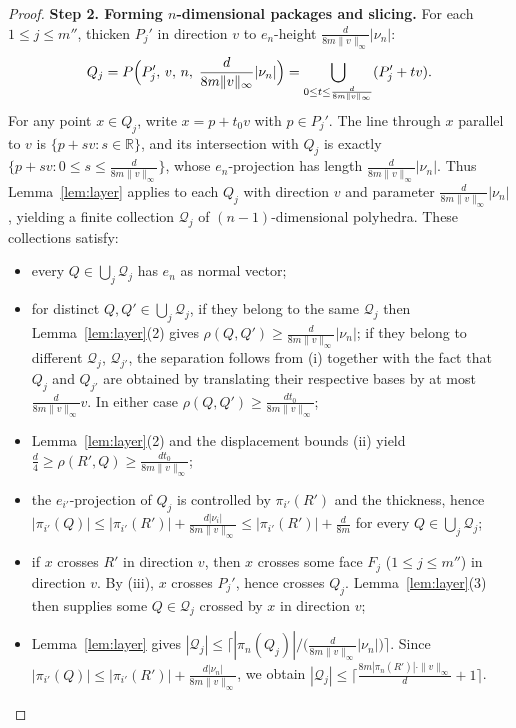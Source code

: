 \documentclass[10pt,a4paper]{amsart}
\begin{document}
\begin{proof}
\medskip\noindent
\textbf{Step 2.  Forming $n$-dimensional packages and slicing.}
For each $1\leq j\leq m''$, thicken $P_j'$ in direction $v$ to
$e_n$-height $\frac{d}{8m\|v\|_\infty}|\nu_n|$:
\[
Q_j=P\Bigl(P_j',\, v,\, n,\; \frac{d}{8m\|v\|_\infty}|\nu_n|\Bigr)
=\bigcup_{0\leq t\leq \frac{d}{8m\|v\|_\infty}}(P_j'+t v).
\]
For any point $x\in Q_j$, write $x=p+t_0 v$ with $p\in P_j'$.  The line
through $x$ parallel to $v$ is $\{p+sv\colon s\in\mathbb{R}\}$, and its
intersection with $Q_j$ is exactly $\{p+sv\colon
0\leq s\leq\frac{d}{8m\|v\|_\infty}\}$, whose $e_n$-projection has length
$\frac{d}{8m\|v\|_\infty}|\nu_n|$.  Thus Lemma~\ref{lem:layer} applies to
each $Q_j$ with direction $v$ and parameter $\frac{d}{8m\|v\|_\infty}|\nu_n|$,
yielding a finite collection $\mathcal{Q}_j$ of $(n-1)$-dimensional polyhedra.
These collections satisfy:
\begin{itemize}
\item[(iv)] every $Q\in\bigcup_j\mathcal{Q}_j$ has $e_n$ as normal vector;
\item[(v)] for distinct $Q,Q'\in\bigcup_j\mathcal{Q}_j$, if they belong to
the same $\mathcal{Q}_j$ then Lemma~\ref{lem:layer}(2) gives
$\rho(Q,Q')\geq\frac{d}{8m\|v\|_\infty}|\nu_n|$; if they belong to different
$\mathcal{Q}_j$, $\mathcal{Q}_{j'}$, the separation follows from (i) together
with the fact that $Q_j$ and $Q_{j'}$ are obtained by translating their
respective bases by at most $\frac{d}{8m\|v\|_\infty}v$.  In either case
$\rho(Q,Q')\geq\frac{d t_0}{8m\|v\|_\infty}$;
\item[(vi)] Lemma~\ref{lem:layer}(2) and the displacement bounds (ii) yield
$\frac{d}{4}\geq\rho(R',Q)\geq\frac{d t_0}{8m\|v\|_\infty}$;
\item[(vii)] the $e_{i'}$-projection of $Q_j$
is controlled by $\pi_{i'}(R')$ and the thickness,
hence $|\pi_{i'}(Q)|\leq |\pi_{i'}(R')|+\frac{d|\nu_i|}{8m\|v\|_{\infty}}\leq |\pi_{i'}(R')|+\frac{d}{8m}$ for every
$Q\in\bigcup_j\mathcal{Q}_j$;
\item[(viii)] if $x$ crosses $R'$ in direction $v$, then $x$ crosses some
face $F_j$ ($1\leq j\leq m''$) in direction $v$.  By (iii), $x$ crosses
$P_j'$, hence crosses $Q_j$.
Lemma~\ref{lem:layer}(3) then supplies some $Q\in\mathcal{Q}_j$ crossed by
$x$ in direction $v$;
\item[(ix)] Lemma~\ref{lem:layer} gives
$|\mathcal{Q}_j|\leq\bigl\lceil |\pi_n(Q_j)|/
\bigl(\frac{d}{8m\|v\|_\infty}|\nu_n|\bigr)\bigr\rceil$.  Since
$|\pi_{i'}(Q)|\leq |\pi_{i'}(R')|+\frac{d|\nu_n|}{8m\|v\|_{\infty}}$, we obtain
$|\mathcal{Q}_j|\leq
\bigl\lceil\frac{8m|\pi_n(R')|\cdot\|v\|_\infty}{d}+1\bigr\rceil$.
\end{itemize}


\end{proof}
\end{document}
